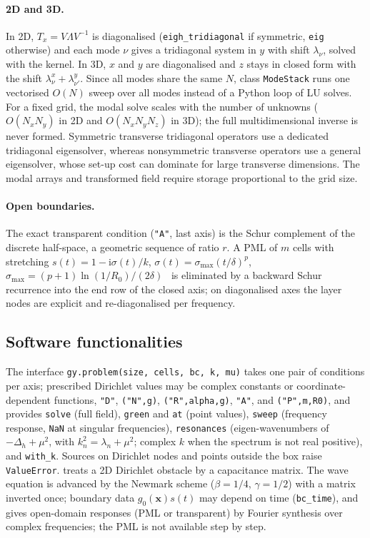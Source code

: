 \documentclass[preprint,12pt,a4paper]{elsarticle}
\newcommand{\ii}{\mathrm{i}}
\begin{document}
\paragraph{2D and 3D.}
In 2D, $T_x=V\Lambda V^{-1}$ is diagonalised (\texttt{eigh\_tridiagonal} if symmetric, \texttt{eig} otherwise) and each mode $\nu$ gives a tridiagonal system in $y$ with shift $\lambda_\nu$, solved with the kernel.
In 3D, $x$ and $y$ are diagonalised and $z$ stays in closed form with the shift $\lambda^x_\nu+\lambda^y_{\nu'}$.
Since all modes share the same $N$, class \texttt{ModeStack} runs one vectorised $O(N)$ sweep over all modes instead of a Python loop of LU solves.
For a fixed grid, the modal solve scales with the number of unknowns ($O(N_xN_y)$ in 2D and $O(N_xN_yN_z)$ in 3D); the full multidimensional inverse is never formed. Symmetric transverse tridiagonal operators use a dedicated tridiagonal eigensolver, whereas nonsymmetric transverse operators use a general eigensolver, whose set-up cost can dominate for large transverse dimensions. The modal arrays and transformed field require storage proportional to the grid size.

\paragraph{Open boundaries.}
The exact transparent condition (\texttt{"A"}, last axis) is the Schur complement of the discrete half-space, a geometric sequence of ratio $r$.
A PML of $m$ cells with stretching $s(t)=1-\ii\sigma(t)/k$, $\sigma(t)=\sigma_{\max}(t/\delta)^p$, $\sigma_{\max}=(p+1)\ln(1/R_0)/(2\delta)$~\cite{Berenger1994} is eliminated by a backward Schur recurrence into the end row of the closed axis; on diagonalised axes the layer nodes are explicit and re-diagonalised per frequency.

\subsection{Software functionalities}
The interface \texttt{gy.problem(size, cells, bc, k, mu)} takes one pair of conditions per axis; prescribed Dirichlet values may be complex constants or coordinate-dependent functions, \texttt{"D"}, \texttt{("N",g)}, \texttt{("R",alpha,g)}, \texttt{"A"}, and \texttt{("P",m,R0)}, and provides
\texttt{solve} (full field), \texttt{green} and \texttt{at} (point values), \texttt{sweep} (frequency response, \texttt{NaN} at singular frequencies), \texttt{resonances} (eigen-wavenumbers of $-\Delta_h+\mu^2$, with $k_n^2=\lambda_n+\mu^2$; complex $k$ when the spectrum is not real positive), and \texttt{with\_k}.
Sources on Dirichlet nodes and points outside the box raise \texttt{ValueError}.
 treats a 2D Dirichlet obstacle by a capacitance matrix.
The wave equation is advanced by the Newmark scheme ($\beta=1/4$, $\gamma=1/2$) with a matrix inverted once; boundary data $g_0(\mathbf x)s(t)$ may depend on time (\texttt{bc\_time}), and  gives open-domain responses (PML or transparent) by Fourier synthesis over complex frequencies; the PML is not available step by step.
\end{document}
